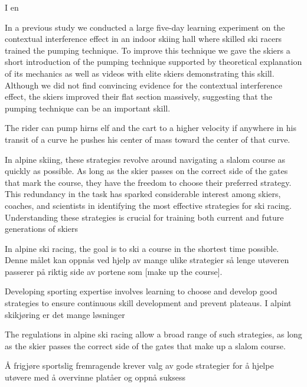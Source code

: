 \documentclass{article}
\begin{document}
I en 

In a previous study we conducted a large five-day learning experiment on the contextual interference effect in an indoor skiing hall where skilled ski racers trained the pumping technique. To improve this technique we gave the skiers a short introduction of the pumping technique supported by theoretical explanation of its mechanics as well as videos with elite skiers demonstrating this skill. Although we did not find convincing evidence for the contextual interference effect, the skiers improved their flat section massively, suggesting that the pumping technique can be an important skill.













The rider can pump hirns elf and the
cart to a higher velocity if anywhere in his transit of a curve he pushes
his center of mass toward the center of that curve.


In alpine skiing, these strategies revolve around navigating a slalom course as quickly as possible. As long as the skier passes on the correct side of the gates that mark the course, they have the freedom to choose their preferred strategy. This redundancy in the task has sparked considerable interest among skiers, coaches, and scientists in identifying the most effective strategies for ski racing. Understanding these strategies is crucial for training both current and future generations of skiers 



In alpine ski racing, the goal is to ski a course in the shortest time possible. Denne målet kan oppnås ved hjelp av mange ulike strategier så lenge utøveren passerer på riktig side av portene som [make up the course]. 




Developing sporting expertise involves learning to choose and develop good strategies to ensure continuous skill development and prevent plateaus. I alpint skikjøring er det mange løsninger 




The regulations in alpine ski racing allow a broad range of such strategies, as long as the skier passes the correct side of the gates that make up a slalom course. 


Å frigjøre sportslig fremragende krever valg av gode strategier for å hjelpe utøvere med å overvinne platåer og oppnå suksess 
\end{document}
